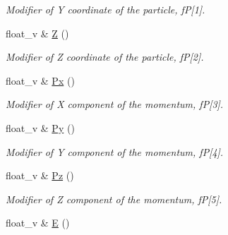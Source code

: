 \begin{DoxyCompactItemize}
\begin{DoxyCompactList}\small\item\em Modifier of Y coordinate of the particle, fP\mbox{[}1\mbox{]}. \end{DoxyCompactList}\item 
float\+\_\+v \& \hyperlink{classKFParticleBaseSIMD_ad89b52dfe1f528db45a5a0c672103f04}{Z} ()\hypertarget{classKFParticleBaseSIMD_ad89b52dfe1f528db45a5a0c672103f04}{}\label{classKFParticleBaseSIMD_ad89b52dfe1f528db45a5a0c672103f04}

\begin{DoxyCompactList}\small\item\em Modifier of Z coordinate of the particle, fP\mbox{[}2\mbox{]}. \end{DoxyCompactList}\item 
float\+\_\+v \& \hyperlink{classKFParticleBaseSIMD_a7b9f51c18e0e6166c713d02379ebbb36}{Px} ()\hypertarget{classKFParticleBaseSIMD_a7b9f51c18e0e6166c713d02379ebbb36}{}\label{classKFParticleBaseSIMD_a7b9f51c18e0e6166c713d02379ebbb36}

\begin{DoxyCompactList}\small\item\em Modifier of X component of the momentum, fP\mbox{[}3\mbox{]}. \end{DoxyCompactList}\item 
float\+\_\+v \& \hyperlink{classKFParticleBaseSIMD_a98e7aec5396e91e5d061b84950eae29a}{Py} ()\hypertarget{classKFParticleBaseSIMD_a98e7aec5396e91e5d061b84950eae29a}{}\label{classKFParticleBaseSIMD_a98e7aec5396e91e5d061b84950eae29a}

\begin{DoxyCompactList}\small\item\em Modifier of Y component of the momentum, fP\mbox{[}4\mbox{]}. \end{DoxyCompactList}\item 
float\+\_\+v \& \hyperlink{classKFParticleBaseSIMD_a16e2c66877a779ea2c557177eb255224}{Pz} ()\hypertarget{classKFParticleBaseSIMD_a16e2c66877a779ea2c557177eb255224}{}\label{classKFParticleBaseSIMD_a16e2c66877a779ea2c557177eb255224}

\begin{DoxyCompactList}\small\item\em Modifier of Z component of the momentum, fP\mbox{[}5\mbox{]}. \end{DoxyCompactList}\item 
float\+\_\+v \& \hyperlink{classKFParticleBaseSIMD_a46d69ecf9cd0c6bbc1a848d5a8e1ae0b}{E} ()\hypertarget{classKFParticleBaseSIMD_a46d69ecf9cd0c6bbc1a848d5a8e1ae0b}{}\label{classKFParticleBaseSIMD_a46d69ecf9cd0c6bbc1a848d5a8e1ae0b}


\end{DoxyCompactItemize}
